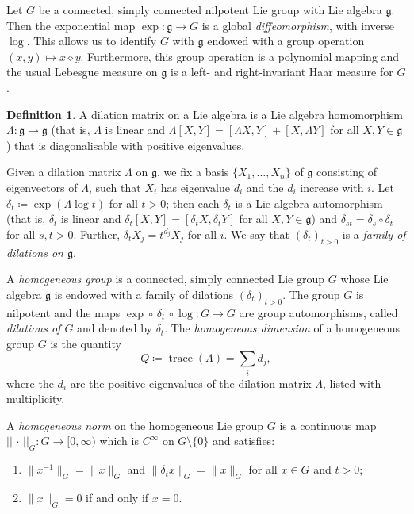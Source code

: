 \documentclass[12pt,twoside,a4paper]{amsart}
\theoremstyle{definition}
\newtheorem{defn}[thm]{Definition}%
\theoremstyle{remark}
\numberwithin{equation}{section}
\newcommand{\Lie}[1]{\mathfrak{#1}}
\newcommand{\trace}{\operatorname{trace}}
\begin{document}
Let $G$ be a connected, simply connected nilpotent Lie group with Lie algebra $\Lie{g}$. 
Then the exponential map $\exp \colon \Lie{g} \to G$ is a global \emph{diffeomorphism}, with inverse $\log$. 
This allows us to identify $G$ with $\Lie{g}$ endowed with a group operation $(x, y) \mapsto x \diamond  y$. 
Furthermore, this group operation is a polynomial mapping and the usual Lebesgue measure on $\Lie{g}$ is a left- and right-invariant Haar measure for $G$. 

\begin{defn}
A dilation matrix on a Lie algebra is a Lie algebra homomorphism $\Lambda\colon  \Lie{g} \to \Lie{g}$ (that is, $\Lambda$ is linear and $\Lambda[X,Y] = [\Lambda X, Y] + [X, \Lambda Y]$ for all $X, Y \in \Lie{g}$) that is diagonalisable with positive eigenvalues.

Given a dilation matrix $\Lambda$ on $\Lie{g}$,  we fix a basis $\{X_1, \dots, X_n\}$ of $\Lie{g}$ consisting of eigenvectors of $\Lambda$, such that $X_i$ has eigenvalue $d_i$ and the $d_i$ increase with $i$. 
Let $\delta_t \coloneqq  \exp(\Lambda \log t)$ for all $t > 0$; then each $\delta_t$ is a Lie algebra automorphism (that is, $\delta_t$ is linear and $\delta_t[X,Y] = [\delta_t X, \delta_t Y ]$ for all $X, Y \in \Lie{g}$) and $\delta_{st} = \delta_s \circ \delta_t$ for all $s, t >0$.
Further,  $\delta_t X_j = t^{d_j} X_j$ for all $i$. 
We say that $(\delta_t)_{t > 0}$ is a \emph{family of dilations on $\Lie{g}$}. 


A \emph{homogeneous group} is a connected, simply connected Lie group $G$ whose Lie algebra $ \Lie{g}$ is endowed with a family of dilations $(\delta_t)_{t > 0}$. 
The group $G$ is nilpotent and the maps $\exp \circ \,\delta_t\, \circ \log  \colon G \to G$ are group automorphisms, called \emph{dilations of $G$} and denoted by $\delta_t$. 
The \emph{homogeneous dimension} of a homogeneous group $G$ is the quantity
\begin{equation*}
    Q \coloneqq  \trace(\Lambda) = \sum_{i} d_j,
\end{equation*}
where  the $d_i $ are the positive eigenvalues of  the dilation matrix $\Lambda$, listed with multiplicity. 

A \emph{homogeneous norm} on the homogeneous Lie group $G$ is a continuous map $||\,\cdot\,||_{G} \colon G \to [0, \infty)$ which is $C^{\infty}$ on $G \setminus \{0\}$ and satisfies: 
\begin{enumerate}
\item $\|x^{-1} \|_{G} = \|x\|_{G}$ and $\|\delta_tx\|_{G} = \|x\|_{G}$ for all $x \in G$ and $t > 0$;
\item $\|x\|_{G} = 0$ if and only if $x = 0$.
\end{enumerate}
\end{defn}
\end{document}
